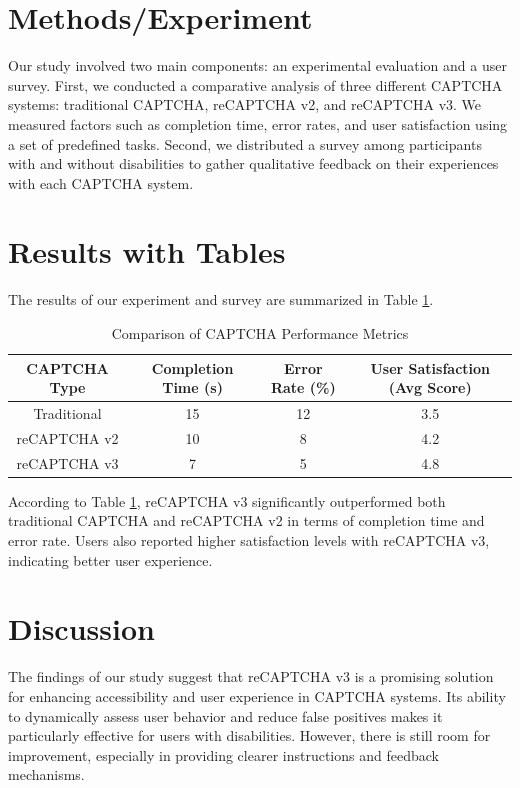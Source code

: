 \section{Methods/Experiment}
Our study involved two main components: an experimental evaluation and a user survey. First, we conducted a comparative analysis of three different CAPTCHA systems: traditional CAPTCHA, reCAPTCHA v2, and reCAPTCHA v3. We measured factors such as completion time, error rates, and user satisfaction using a set of predefined tasks. Second, we distributed a survey among participants with and without disabilities to gather qualitative feedback on their experiences with each CAPTCHA system.

\section{Results with Tables}
The results of our experiment and survey are summarized in Table \ref{tab:results}.

\begin{table}[htbp]
\centering
\begin{tabular}{|c|c|c|c|}
\hline
\textbf{CAPTCHA Type} & \textbf{Completion Time (s)} & \textbf{Error Rate (\%)} & \textbf{User Satisfaction (Avg Score)} \\
\hline
Traditional & 15 & 12 & 3.5 \\
\hline
reCAPTCHA v2 & 10 & 8 & 4.2 \\
\hline
reCAPTCHA v3 & 7 & 5 & 4.8 \\
\hline
\end{tabular}
\caption{Comparison of CAPTCHA Performance Metrics}
\label{tab:results}
\end{table}

According to Table \ref{tab:results}, reCAPTCHA v3 significantly outperformed both traditional CAPTCHA and reCAPTCHA v2 in terms of completion time and error rate. Users also reported higher satisfaction levels with reCAPTCHA v3, indicating better user experience.

\section{Discussion}
The findings of our study suggest that reCAPTCHA v3 is a promising solution for enhancing accessibility and user experience in CAPTCHA systems. Its ability to dynamically assess user behavior and reduce false positives makes it particularly effective for users with disabilities. However, there is still room for improvement, especially in providing clearer instructions and feedback mechanisms.

